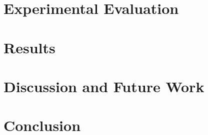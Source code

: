 \documentclass[runningheads]{llncs}
\begin{document}
\setlength{\tabcolsep}{1.4pt}
  
\section{Experimental Evaluation}

\section{Results}

\section{Discussion and Future Work}

\section{Conclusion}



\end{document}
